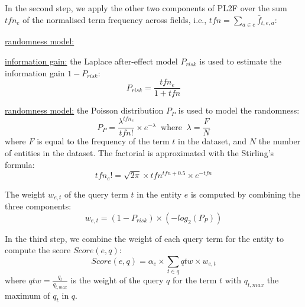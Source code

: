 In the second step, we apply the other two components of PL2F over the sum $tfn_e$ of the normalised term frequency across fields, i.e., $tfn = \sum_{a \in e}{\bar{f}_{t,e,a}}$:
\begin{labeling}{\underline{randomness model:}}
	\item[\underline{information gain:}] the Laplace after-effect model $P_{risk}$ is used to estimate the information gain $1-P_{risk}$:
	\begin{equation}
		P_{risk} = \frac{tfn_e}{1+tfn}
		\label{eq:dfr-prisk}
	\end{equation}

	\item[\underline{randomness model:}] the Poisson distribution $P_P$ is used to model the randomness:
	\begin{equation}
		P_{P} = \frac{\lambda^{tfn_e}}{tfn!}\times e^{-\lambda} \:\text{ where }\: \lambda=\frac{F}{N}
		\label{eq:dfr:rand-poisson}
	\end{equation}
	where $F$ is equal to the frequency of the term $t$ in the dataset, and $N$ the number of entities in the dataset.
	The factorial is approximated with the Stirling's formula:
	$$
	tfn_e!=\sqrt{2\pi}\times tfn^{tfn+0.5}\times e^{-tfn}
	$$
\end{labeling}

The weight $w_{e,t}$ of the query term $t$ in the entity $e$ is computed by combining the three components:
\begin{equation}
	w_{e,t} = \left(1-P_{risk}\right) \times \left(-log_2\left(P_{P}\right)\right)
	\label{eq:dfr-term-weight}
\end{equation}

In the third step, we combine the weight of each query term for the entity to compute the score $Score(e,q)$:
\begin{equation}
	Score(e,q) = \alpha_e\times\sum_{t\in q}{qtw \times w_{e,t}}
	\label{eq:dfr-score}
\end{equation}
where $qtw=\frac{q_t}{q_{t,max}}$ is the weight of the query $q$ for the term $t$ with $q_{t,max}$ the maximum of $q_t$ in $q$.
